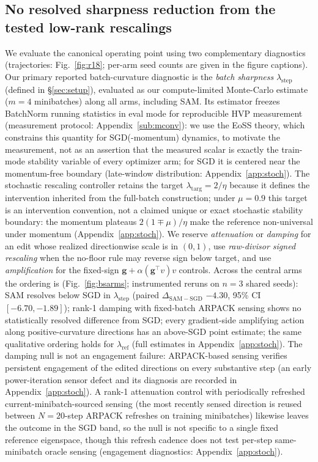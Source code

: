 \documentclass{article}
\theoremstyle{plain}
\theoremstyle{definition}
\theoremstyle{remark}
\newcommand{\lref}{\ensuremath{\lambda_{\mathrm{ref}}}}
\newcommand{\lstep}{\ensuremath{\lambda_{\mathrm{step}}}}
\begin{document}
\subsection{No resolved sharpness reduction from the tested low-rank
rescalings}
\label{sub:scale}
We evaluate the canonical operating point using
two complementary diagnostics (trajectories:
Fig.~\ref{fig:r18}; per-arm seed counts are given in the figure
captions). Our primary reported
batch-curvature diagnostic is the \emph{batch sharpness} $\lstep$
(defined in \S\ref{sec:setup}), evaluated as our compute-limited
Monte-Carlo estimate ($m{=}4$ minibatches) along all arms, including
SAM. Its estimator freezes BatchNorm running statistics in eval mode
for reproducible HVP measurement (measurement protocol:
Appendix~\ref{sub:mconv}): we use the EoSS theory, which constrains
this quantity for SGD(-momentum) dynamics, to motivate the
measurement, not as an assertion that the measured scalar is exactly
the train-mode stability variable of every optimizer arm; for SGD it
is centered near the momentum-free boundary (late-window
distribution: Appendix~\ref{app:stoch}). The stochastic rescaling
controller retains the target $\lambda_{\mathrm{targ}}{=}2/\eta$ because
it defines the intervention inherited from the full-batch construction;
under $\mu{=}0.9$ this target is an intervention convention, not a
claimed unique or exact stochastic stability boundary: the momentum
plateaus $2(1{\mp}\mu)/\eta$ make the reference non-universal under
momentum (Appendix~\ref{app:stoch}). We
reserve \emph{attenuation} or \emph{damping} for an edit whose realized
directionwise scale is in $(0,1)$, use \emph{raw-divisor signed
rescaling} when the no-floor rule may reverse sign below target, and
use \emph{amplification} for the fixed-sign
$\mathbf{g}+\alpha(\mathbf{g}^{\top}v)v$ controls. Across the
central arms
the ordering is (Fig.~\ref{fig:bsarms}; instrumented reruns on
$n{=}3$ shared seeds): SAM resolves below SGD in
$\lstep$ (paired $\Delta_{\mathrm{SAM-SGD}}$ $-4.30$, 95\% CI
$[{-}6.70,{-}1.89]$); rank-1 damping with fixed-batch ARPACK sensing
shows no statistically resolved difference from SGD; every gradient-side
amplifying action along positive-curvature directions has an
above-SGD point estimate; the same
qualitative ordering holds for $\lref$ (full estimates in
Appendix~\ref{app:stoch}). The
damping null is not an engagement failure: ARPACK-based sensing
verifies persistent engagement of the edited directions on
every substantive step (an early power-iteration sensor defect and
its diagnosis are recorded in Appendix~\ref{app:stoch}).
A rank-1 attenuation control with periodically refreshed
current-minibatch-sourced sensing (the most recently sensed
direction is reused between $N{=}20$-step ARPACK refreshes on
training minibatches) likewise
leaves the outcome in the SGD band, so the null is not specific to a
single fixed reference eigenspace, though this refresh cadence does
not test per-step same-minibatch oracle sensing (engagement
diagnostics: Appendix~\ref{app:stoch}).
\end{document}
